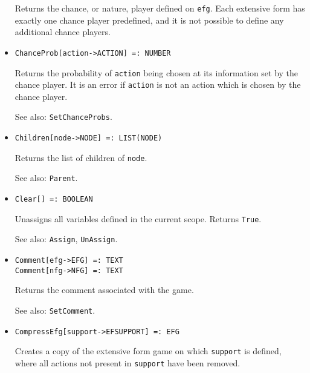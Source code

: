 \begin{itemize}
\bd
Returns the chance, or nature, player defined on \verb+efg+.
Each extensive form has exactly one
chance player predefined, and it is not possible to define any additional
chance players.
\ed

\item{}
\protect \large \begin{verbatim}
ChanceProb[action->ACTION] =: NUMBER 
\end{verbatim}\normalsize

\bd
Returns the probability of \verb+action+ being chosen at its information
set by the chance player.  It is an error if \verb+action+ is not an action
which is chosen by the chance player.
\item [See also:] \verb+SetChanceProbs+.
\ed

\item{}
\protect \large \begin{verbatim} 
Children[node->NODE] =: LIST(NODE) 
\end{verbatim}\normalsize

\bd
Returns the list of children of \verb+node+.
\item [See also:] \verb+Parent+.
\ed

\item{}
\protect \large \begin{verbatim}
Clear[] =: BOOLEAN 
\end{verbatim}\normalsize

\bd
Unassigns all variables defined in the current scope.  Returns \verb+True+.
\item [See also:] \verb+Assign+, \verb+UnAssign+.
\ed

\item{}
\protect \large \begin{verbatim}
Comment[efg->EFG] =: TEXT
Comment[nfg->NFG] =: TEXT
\end{verbatim}\normalsize

\bd
Returns the comment associated with the game.
\item [See also:] \verb+SetComment+.
\ed

\item{}
\protect \large \begin{verbatim}
CompressEfg[support->EFSUPPORT] =: EFG 
\end{verbatim}\normalsize

\bd
Creates a copy of the extensive form game on which \verb+support+ is
defined, where all actions not present in \verb+support+ have been
removed.
\ed


\end{itemize}
